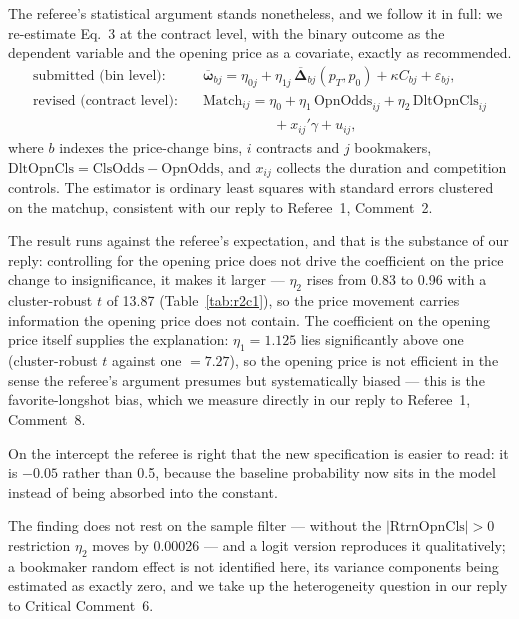 \documentclass[letterpaper,12pt]{article}
\newcommand{\bs}{\boldsymbol}
\newcounter{b}
\begin{document}
\begin{enumerate}
{The referee's statistical argument stands nonetheless, and we follow it in full: we re-estimate Eq.~3 at the contract level, with the binary outcome as the dependent variable and the opening price as a covariate, exactly as recommended.
\begin{align*}
\text{submitted (bin level):} \quad & \overline{\bs{\omega}}_{bj} = \eta_{0j} + \eta_{1j} \, \overline{\bs{\Delta}}_{bj}(p_T, p_0) + \kappa C_{bj} + \varepsilon_{bj}, \\
\text{revised (contract level):} \quad & \text{Match}_{ij} = \eta_0 + \eta_1 \, \text{OpnOdds}_{ij} + \eta_2 \, \text{DltOpnCls}_{ij} \\
 & \qquad\qquad\quad {} + x_{ij}' \gamma + u_{ij},
\end{align*}
where $b$ indexes the price-change bins, $i$ contracts and $j$ bookmakers, $\text{DltOpnCls} = \text{ClsOdds} - \text{OpnOdds}$, and $x_{ij}$ collects the duration and competition controls. The estimator is ordinary least squares with standard errors clustered on the matchup, consistent with our reply to Referee~1, Comment~2.

The result runs against the referee's expectation, and that is the substance of our reply: controlling for the opening price does not drive the coefficient on the price change to insignificance, it makes it larger --- $\eta_2$ rises from 0.83 to 0.96 with a cluster-robust $t$ of 13.87 (Table~\ref{tab:r2c1}), so the price movement carries information the opening price does not contain. The coefficient on the opening price itself supplies the explanation: $\eta_1 = 1.125$ lies significantly above one (cluster-robust $t$ against one $=7.27$), so the opening price is not efficient in the sense the referee's argument presumes but systematically biased --- this is the favorite-longshot bias, which we measure directly in our reply to Referee~1, Comment~8.

On the intercept the referee is right that the new specification is easier to read: it is $-0.05$ rather than 0.5, because the baseline probability now sits in the model instead of being absorbed into the constant.

The finding does not rest on the sample filter --- without the $|\text{RtrnOpnCls}| > 0$ restriction $\eta_2$ moves by 0.00026 --- and a logit version reproduces it qualitatively; a bookmaker random effect is not identified here, its variance components being estimated as exactly zero, and we take up the heterogeneity question in our reply to Critical Comment~6.

}
\end{enumerate}
\end{document}
